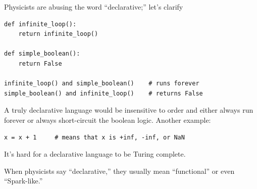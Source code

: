 \documentclass[aspectratio=169]{beamer}
\begin{document}
\begin{frame}[fragile]{Physicists are abusing the word ``declarative;'' let's clarify}
\small
\vspace{0.25 cm}
\begin{center}
\begin{minipage}{0.8\linewidth}
\begin{verbatim}
def infinite_loop():
    return infinite_loop()

def simple_boolean():
    return False

infinite_loop() and simple_boolean()    # runs forever
simple_boolean() and infinite_loop()    # returns False
\end{verbatim}
\end{minipage}
\end{center}

\normalsize
\vspace{0.25 cm}
A truly declarative language would be insensitive to order and either always run forever or always short-circuit the boolean logic. Another example:

\small
\begin{center}
\begin{minipage}{0.8\linewidth}
\begin{verbatim}
x = x + 1     # means that x is +inf, -inf, or NaN
\end{verbatim}
\end{minipage}
\end{center}

\normalsize
It's hard for a declarative language to be Turing complete.

\vspace{0.5 cm}
When physicists say ``declarative,'' they usually mean ``functional'' or even ``Spark-like.''
\end{frame}
\end{document}
